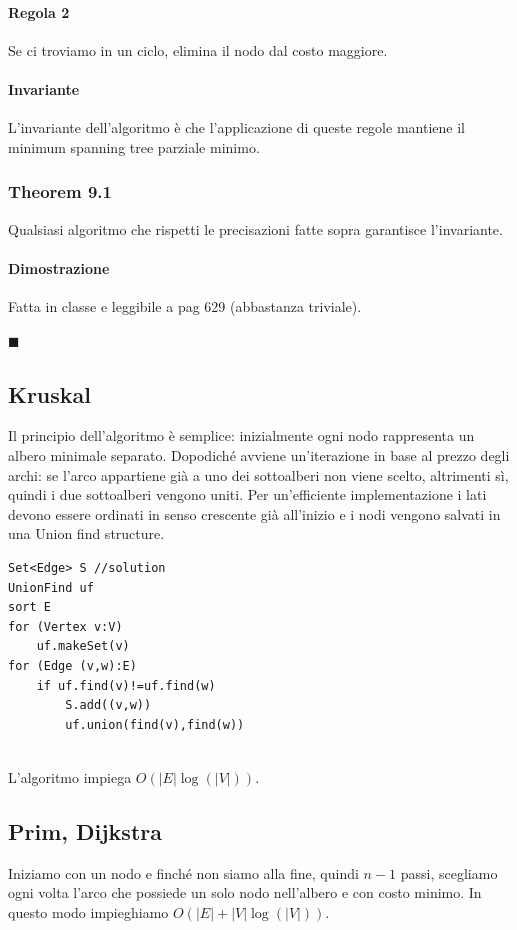 \documentclass[a4paper]{book}
\newenvironment{mytheorem}[1]{\subsubsection*{Theorem #1}}{\begin{flushright}$\blacksquare$\end{flushright}}
\newcommand{\lstIndent}{4}
\begin{document}
\paragraph*{Regola 2} Se ci troviamo in un ciclo, elimina il nodo dal costo maggiore.
\paragraph*{Invariante} L'invariante dell'algoritmo è che l'applicazione di queste regole mantiene il minimum spanning tree parziale minimo. 
\begin{mytheorem}{9.1}
Qualsiasi algoritmo che rispetti le precisazioni fatte sopra garantisce l'invariante.
\paragraph*{Dimostrazione} Fatta in classe e leggibile a pag 629 (abbastanza triviale).
\end{mytheorem}
\subsection{Kruskal}
Il principio dell'algoritmo è semplice: inizialmente ogni nodo rappresenta un albero minimale separato. Dopodiché avviene un'iterazione in base al prezzo degli archi: se l'arco appartiene già a uno dei sottoalberi non viene scelto, altrimenti sì, quindi i due sottoalberi vengono uniti. Per un'efficiente implementazione i lati devono essere ordinati in senso crescente già all'inizio e i nodi vengono salvati in una Union find structure. 
\begin{lstlisting}[tabsize=\lstIndent]
Set<Edge> S //solution
UnionFind uf
sort E
for (Vertex v:V)
	uf.makeSet(v)
for (Edge (v,w):E)
	if uf.find(v)!=uf.find(w)
		S.add((v,w))
		uf.union(find(v),find(w))
	
\end{lstlisting}
L'algoritmo impiega $O(|E|\log (|V|))$.
\subsection{Prim, Dijkstra}
Iniziamo con un nodo e finché non siamo alla fine, quindi $n-1$ passi, scegliamo ogni volta l'arco che possiede un solo nodo nell'albero e con costo minimo. In questo modo impieghiamo $O(|E|+|V|\log (|V|))$.
\end{document}
